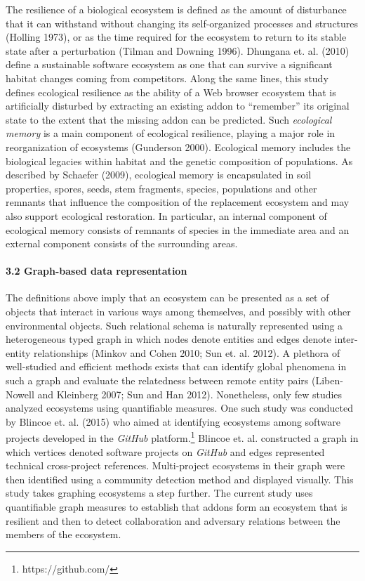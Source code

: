 \documentclass{article} %
\begin{document}
The resilience of a biological ecosystem is defined as the amount of disturbance that it can withstand without changing its self-organized processes and structures (Holling 1973), or as the time required for the ecosystem to return to its stable state after a perturbation (Tilman and Downing 1996). Dhungana et. al. (2010) define a sustainable software ecosystem as one that can survive a significant habitat changes coming from competitors. Along the same lines, this study defines ecological resilience as the ability of a Web browser ecosystem that is artificially disturbed by extracting an existing addon to ``remember'' its original state to the extent that the missing addon can be predicted. Such \textit{ecological memory} is a main component of ecological resilience, playing a major role in reorganization of ecosystems (Gunderson 2000). Ecological memory includes the biological legacies within habitat and the genetic composition of populations. As described by Schaefer (2009), ecological memory is encapsulated in soil properties, spores, seeds, stem fragments, species, populations and other remnants that influence the composition of the replacement ecosystem and may also support ecological restoration. In particular, an internal component of ecological memory consists of remnants of species in the immediate area and an external component consists of the surrounding areas. 




\paragraph{3.2  Graph-based data representation}

 

The definitions above imply that an ecosystem can be presented as a set of objects that interact in various ways among themselves, and possibly with other environmental objects. Such relational schema is naturally represented using a heterogeneous typed graph in which nodes denote entities and edges denote inter-entity relationships (Minkov and Cohen 2010; Sun et. al. 2012). A plethora of well-studied and efficient methods exists that can identify global phenomena in such a graph and evaluate the relatedness between remote entity pairs (Liben-Nowell and Kleinberg 2007; Sun and Han 2012). Nonetheless, only few studies analyzed ecosystems using quantifiable measures. One such study was conducted by Blincoe et. al. (2015) who aimed at identifying ecosystems among software projects developed in the \textit{GitHub} platform.\footnote{ https://github.com/} Blincoe et. al. constructed a graph in which vertices denoted software projects on \textit{GitHub} and edges represented technical cross-project references. Multi-project ecosystems in their graph were then identified using a community detection method and displayed visually. This study takes graphing ecosystems a step further. The current study uses quantifiable graph measures to establish that addons form an ecosystem that is resilient and then to detect collaboration and adversary relations between the members of the ecosystem.
\end{document}
